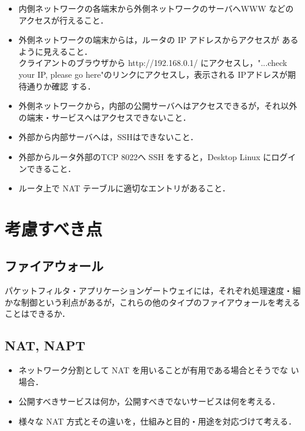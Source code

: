 \begin{itemize}
 \item 内側ネットワークの各端末から外側ネットワークのサーバへWWW
       などのアクセスが行えること．
 \item 外側ネットワークの端末からは，ルータの IP アドレスからアクセスが
       あるように見えること．\\ クライアントのブラウザから 
       http://192.168.0.1/ にアクセスし，"...check your IP, please go
       here"のリンクにアクセスし，表示される IPアドレスが期待通りか確認
       する．
 \item 外側ネットワークから，内部の公開サーバへはアクセスできるが，それ以外の端末・サービスへはアクセスできないこと．
 \item 外部から内部サーバへは，SSHはできないこと．
 \item 外部からルータ外部のTCP 8022へ SSH をすると，Desktop Linux にログインできること．
 \item ルータ上で NAT テーブルに適切なエントリがあること．
\end{itemize}




\section{考慮すべき点}

\subsection*{ファイアウォール}

パケットフィルタ・アプリケーションゲートウェイには，それぞれ処理速度・細
かな制御という利点があるが，これらの他のタイプのファイアウォールを考える
ことはできるか．

\subsection*{NAT, NAPT}

\begin{itemize}
 \item ネットワーク分割として NAT を用いることが有用である場合とそうでな
       い場合．
 \item 公開すべきサービスは何か，公開すべきでないサービスは何を考える．
 \item 様々な NAT 方式とその違いを，仕組みと目的・用途を対応づけて考える．
\end{itemize}


